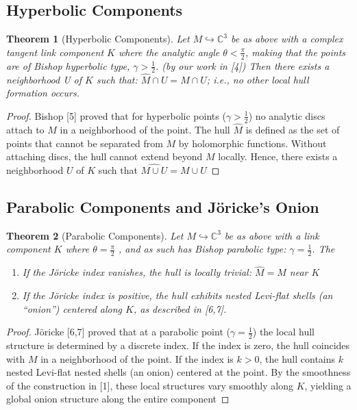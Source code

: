 \documentclass{amsart}
\newtheorem{theorem}{Theorem}
\begin{document}
\subsection{Hyperbolic Components}
\begin{theorem}[Hyperbolic Components]
Let $M \hookrightarrow \mathbb{C}^3$ be as above with a complex tangent link component $K$ where the analytic angle $\theta < \frac{\pi}{2}$, making that the points are of  Bishop hyperbolic type, $\gamma > \frac{1}{2}$. (by our work in [4])  Then there exists a neighborhood U of $K$ such that: $\hat{M} \cap U = M \cap U$; i.e., no other local hull formation occurs.\end{theorem}\begin{proof}Bishop [5] proved that for hyperbolic points ($\gamma > \frac{1}{2}$) no analytic discs attach to $M$ in a neighborhood of the point. The hull $\hat{M}$ is defined as the set of points that cannot be separated from $M$ by holomorphic functions. Without attaching discs, the hull cannot extend beyond $M$ locally. Hence, there exists a neighborhood $U$ of $K$ such that $\widehat{M \cup U} = M \cup U$

\end{proof}
\subsection{Parabolic Components and Jöricke's Onion}
\begin{theorem}
[Parabolic Components]Let $M \hookrightarrow \mathbb{C}^3$ be as above with a link component $K$ where $\theta = \frac{\pi}{2}$ , and as such has Bishop parabolic type: $\gamma = \frac{1}{2}$. The
\begin{enumerate}\item If the Jöricke index vanishes, the hull is locally trivial: $\hat{M} = M$ near $K$
\item If the Jöricke index is positive, the hull exhibits nested Levi-flat shells (an ``onion'') centered along $K$, as described in [6,7].
\end{enumerate}
\end{theorem}
\begin{proof}
Jöricke [6,7] proved that at a parabolic point ($\gamma = \frac{1}{2}$) the local hull structure is determined by a discrete index. If the index is zero, the hull coincides with $M$ in a neighborhood of the point. If the index is $k > 0$, the hull contains $k$ nested Levi-flat nested shells (an onion) centered at the point. By the smoothness of the construction in [1], these local structures vary smoothly along $K$, yielding a global onion structure along the entire component
\end{proof}
\end{document}
